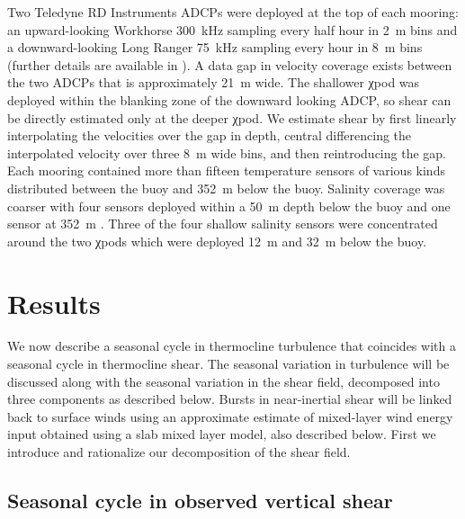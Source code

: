 \documentclass[onecol]{ametsoc}
\begin{document}
Two Teledyne RD Instruments ADCPs were deployed at the top of each mooring: an upward-looking Workhorse \SI{300}{kHz} sampling every half hour in \SI{2}{m} bins and a downward-looking Long Ranger \SI{75}{kHz} sampling every hour in \SI{8}{m} bins (further details are available in \citealp{Wijesekera2016a}).
A data gap in velocity coverage exists between the two ADCPs that is approximately \SI{21}{m} wide.
The shallower χpod was deployed within the blanking zone of the downward looking ADCP, so shear can be directly estimated only at the deeper χpod.
We estimate shear by first linearly interpolating the velocities over the gap in depth, central differencing the interpolated velocity over three \SI{8}{m} wide bins, and then reintroducing the gap.
Each mooring contained more than fifteen temperature sensors of various kinds distributed between the buoy and \SI{352}{m} below the buoy.
Salinity coverage was coarser with four sensors deployed within a \SI{50}{m} depth below the buoy and one sensor at \SI{352}{m} \citep{Wijesekera2016a}.
Three of the four shallow salinity sensors were concentrated around the two χpods which were deployed \SI{12}{m} and \SI{32}{m} below the buoy.

\section{Results}
\label{sec:results}

We now describe a seasonal cycle in thermocline turbulence that coincides with a seasonal cycle in thermocline shear.
The seasonal variation in turbulence will be discussed along with the seasonal variation in the shear field, decomposed into three components as described below.
Bursts in near-inertial shear will be linked back to surface winds using an approximate estimate of mixed-layer wind energy input obtained using a slab mixed layer model, also described below.
First we introduce and rationalize our decomposition of the shear field.

\subsection{Seasonal cycle in observed vertical shear}
\label{sec:shear}
\end{document}
